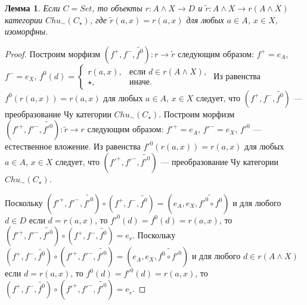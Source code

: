 \documentclass[a4paper,12pt]{article}
\newtheorem{lemma}{Лемма}
\begin{document}
\begin{lemma}\label{iso-c}
    Если $C = Set$, то объекты $r: A \wedge X \to D$ и $\tilde{r}: A \wedge X \to r(A \wedge X)$ категории $Chu_\sim(C_\star)$, где $\tilde{r}(a,x) = r(a,x)$ для любых $a \in A$, $x \in X$, изоморфны.
\end{lemma}
\begin{proof}
    Построим морфизм $(f^+,f^-,\widetilde{f^0}): r \to \tilde{r}$ следующим образом: $f^+ = e_A$, $f^- = e_X$, $f^0(d) = 
    \begin{cases}
        r(a,x),& \text{если } d \in r(A \wedge X),\\
        \star,& \text{иначе}.
    \end{cases}$
    Из равенства $f^0(r(a,x)) = r(a,x)$ для любых $a \in A$, $x \in X$ следует, что $(f^+,f^-,\widetilde{f^0})$ --- преобразование Чу категории $Chu_\sim(C_\star)$. Построим морфизм $(f'^+,f'^-,\widetilde{f'^0}): \tilde{r} \to r$ следующим образом: $f'^+ = e_A$, $f'^- = e_X$, $f'^0$ --- естественное вложение. Из равенства $f'^0(r(a,x)) = r(a,x)$ для любых $a \in A$, $x \in X$ следует, что $(f'^+,f'^-,\widetilde{f'^0})$ --- преобразование Чу категории $Chu_\sim(C_\star)$.

    Поскольку $(f'^+,f'^-,\widetilde{f'^0}) \circ (f^+,f^-,\widetilde{f^0}) = (e_A,e_X,\widetilde{f'^0 \circ f^0})$ и для любого $d \in D$ если $d = r(a,x)$, то $f'^0(d) = f^0(d) = r(a,x)$, то $(f'^+,f'^-,\widetilde{f'^0}) \circ (f^+,f^-,\widetilde{f^0}) = e_r$. Поскольку $(f^+,f^-,\widetilde{f^0}) \circ (f'^+,f'^-,\widetilde{f'^0}) = (e_A,e_X,\widetilde{f^0 \circ f'^0})$ и для любого $d \in r(A \wedge X)$ если $d = r(a,x)$, то $f^0(d) = f'^0(d) = r(a,x)$, то $(f^+,f^-,\widetilde{f^0}) \circ (f'^+,f'^-,\widetilde{f'^0}) = e_{\tilde{r}}$.
\end{proof}
\end{document}
